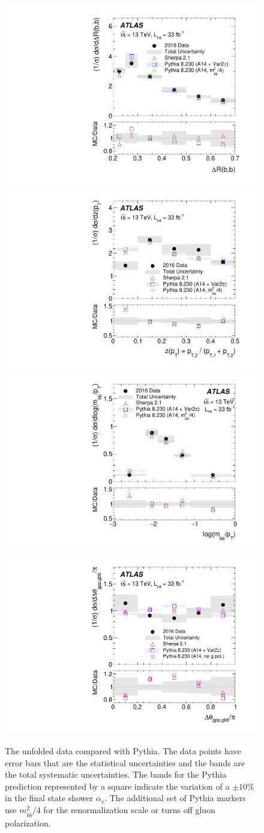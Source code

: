 \begin{figure}[htpb!]
\begin{center}
  \includegraphics[width=0.45\linewidth]{figures/gbb/unfold_final_dR}
  \includegraphics[width=0.45\linewidth]{figures/gbb/unfold_final_zpt}
  \includegraphics[width=0.45\linewidth]{figures/gbb/unfold_final_mass}
  \includegraphics[width=0.45\linewidth]{figures/gbb/unfold_final_dtheta}
\caption[]{The unfolded data compared with Pythia. The data points have error bars that are the statistical uncertainties and the bands are the total systematic uncertainties. The bands for the Pythia prediction represented by a square indicate the variation of a $\pm10\%$ in the final state shower $\alpha_s$. The additional set of Pythia markers use $m_{b\bar b}^2/4$ for the renormalization scale or turns off gluon polarization.}
\label{fig:gbb-results}
\end{center}
\end{figure}



